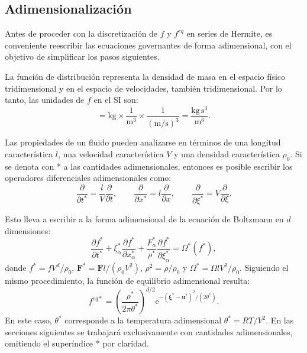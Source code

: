 \subsection{Adimensionalizaci\'on}
Antes de proceder con la discretizaci\'on de $f$ y $f^{eq}$ en series de Hermite, es conveniente reescribir las ecuaciones governantes de forma adimensional, con el objetivo de simplificar los pasos siguientes.
\par
La funci\'on de distribuci\'on \fvar{} representa la densidad de masa en el espacio f\'isico tridimensional y en el espacio de velocidades, tambi\'en tridimensional. Por lo tanto, las unidades de $f$ en el SI son:
\begin{equation}
	[f] = \mbox{kg} \times \dfrac{1}{\mbox{m}^3} \times \dfrac{1}{(\mbox{m/s})^3} = \dfrac{\mbox{kg} \, \mbox{s}^3}{\mbox{m}^6}.
\end{equation}

Las propiedades de un fluido pueden analizarse en t\'erminos de una longitud caracter\'istica $l$, una velocidad caracter\'istica $V$ y una densidad caracter\'istica $\rho_0$. Si se denota con * a las cantidades adimensionales, entonces es posible escribir los operadores diferenciales adimensionales como:
\begin{equation}
\dfrac{\partial}{\partial t^*} = \dfrac{l}{V}\dfrac{\partial}{\partial t}, \qquad
\dfrac{\partial}{\partial x^*} = l\dfrac{\partial}{\partial x}, \qquad
\dfrac{\partial}{\partial \xi^*} = V\dfrac{\partial}{\partial \xi}.
\end{equation}

Esto lleva a escribir a la forma adimensional de la ecuaci\'on de Boltzmann en $d$ dimensiones:
\begin{equation}
	\dfrac{\partial f^*}{\partial t^*}  
	+  \xi^*_{\alpha} \dfrac{\partial f^*}{\partial x^*_{\alpha}} 
	+  \dfrac{F^*_{\alpha}}{\rho^*} \dfrac{\partial f^*}{\partial \xi^*_{\alpha}} =\Omega^*(f^*),
	\label{eq:boltz_adim}
\end{equation}
donde $f^* = fV^d/\rho_0$, $\bm{F}^* = \bm{F}l/(\rho_0 V^2)$, $\rho^2 = \rho/\rho_0$ y $\Omega^*= \Omega l V^2 / \rho_0$. Siguiendo el mismo procedimiento, la funci\'on de equilibrio adimensional resulta:
\begin{equation}
	f^{eq*}	= \left( \dfrac{\rho^*}{2\pi \theta^*} \right)^{d/2} \mbox{e}^{-(\bm{\xi}^* - \bm{u}^*)^2/(2\theta^*)}.
\end{equation}
En este caso, $\theta^*$ corresponde a la temperatura adimensional $\theta^*=RT/V^2$. En las secciones siguientes se trabajar\'a exclusivamente con cantidades adimensionales, omitiendo el super\'indice * por claridad.



